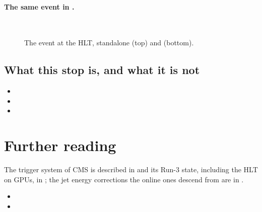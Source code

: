 \paragraph{The same event in \CMSSW.}
\label{sec:second_checkpoint:cmssw_event}

\begin{figure}[p]\centering
{}\\[2mm]
\caption[The event at the HLT, standalone and \CMSSW]{The event at the
HLT, standalone (top) and \CMSSW (bottom). }
\label{fig:second_checkpoint:displays}
\end{figure}

\subsection{What this stop is, and what it is not}
\label{sec:second_checkpoint:caveats}
\begin{itemize}
  \item {}
  \item {}
  \item {}
\end{itemize}

\section{Further reading}
\label{sec:second_checkpoint:further_reading}
The trigger system of CMS is described in \cite{CMS:2016ngn} and its
Run-3 state, including the HLT on GPUs, in \cite{CMS:2024aqx}; the jet
energy corrections the online ones descend from are in \cite{CMS:2016lmd}.

\begin{pitfalls}
\begin{itemize}[nosep]
  \item {}
  \item {}
\end{itemize}
\end{pitfalls}

